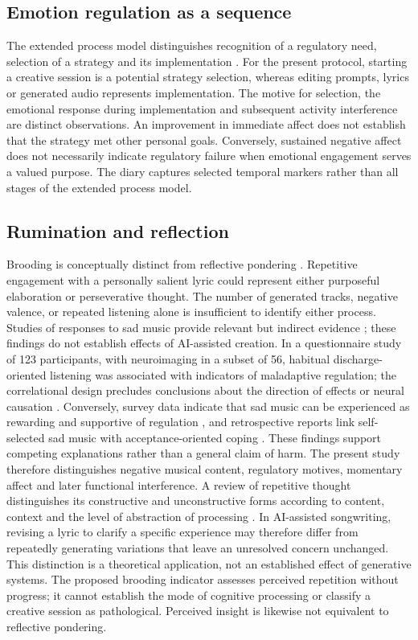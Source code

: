 \documentclass[11pt]{article}
\begin{document}
\subsection{Emotion regulation as a sequence}
The extended process model distinguishes recognition of a regulatory need, selection of a strategy and its implementation \citep{gross2015}. For the present protocol, starting a creative session is a potential strategy selection, whereas editing prompts, lyrics or generated audio represents implementation. The motive for selection, the emotional response during implementation and subsequent activity interference are distinct observations. An improvement in immediate affect does not establish that the strategy met other personal goals. Conversely, sustained negative affect does not necessarily indicate regulatory failure when emotional engagement serves a valued purpose. The diary captures selected temporal markers rather than all stages of the extended process model.

\subsection{Rumination and reflection}
Brooding is conceptually distinct from reflective pondering \citep{treynor2003}. Repetitive engagement with a personally salient lyric could represent either purposeful elaboration or perseverative thought. The number of generated tracks, negative valence, or repeated listening alone is insufficient to identify either process. Studies of responses to sad music provide relevant but indirect evidence \citep{garrido2013,garrido2015}; these findings do not establish effects of AI-assisted creation. In a questionnaire study of 123 participants, with neuroimaging in a subset of 56, habitual discharge-oriented listening was associated with indicators of maladaptive regulation; the correlational design precludes conclusions about the direction of effects or neural causation \citep{carlson2015}. Conversely, survey data indicate that sad music can be experienced as rewarding and supportive of regulation \citep{taruffi2014}, and retrospective reports link self-selected sad music with acceptance-oriented coping \citep{tol2016}. These findings support competing explanations rather than a general claim of harm. The present study therefore distinguishes negative musical content, regulatory motives, momentary affect and later functional interference.
A review of repetitive thought distinguishes its constructive and unconstructive forms according to content, context and the level of abstraction of processing \citep{watkins2008}. In AI-assisted songwriting, revising a lyric to clarify a specific experience may therefore differ from repeatedly generating variations that leave an unresolved concern unchanged. This distinction is a theoretical application, not an established effect of generative systems. The proposed brooding indicator assesses perceived repetition without progress; it cannot establish the mode of cognitive processing or classify a creative session as pathological. Perceived insight is likewise not equivalent to reflective pondering.
\end{document}
